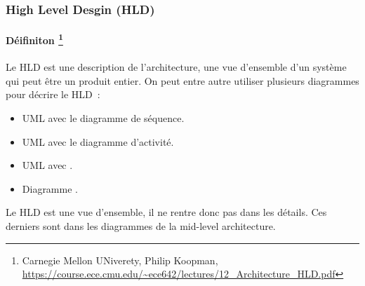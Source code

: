 \documentclass{beamer}
\begin{document}
    \begin{frame}
        \transdissolve
        \frametitle{High Level Desgin (HLD)}
        \framesubtitle{Déifiniton \footnote{Carnegie Mellon UNiverety, Philip Koopman, \url{https://course.ece.cmu.edu/~ece642/lectures/12_Architecture_HLD.pdf}}}
        Le HLD est une description de l'architecture, une vue d'ensemble d'un système qui peut être un produit entier.
        \bigbreak
        On peut entre autre utiliser plusieurs diagrammes pour décrire le HLD~:
        \begin{itemize}
            \item UML avec le diagramme de séquence.
            \item UML avec le diagramme d'activité.
            \item UML avec .
            \item Diagramme .
        \end{itemize}
        \bigbreak
        Le HLD est une vue d'ensemble, il ne rentre donc pas dans les détails.
        Ces derniers sont dans les diagrammes de la mid-level architecture.
    \end{frame}
\end{document}
